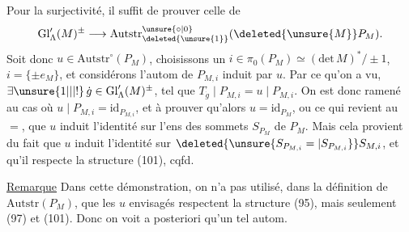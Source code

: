 Pour la surjectivité, il suffit de prouver celle de
\[
\mathrm{Gl}'_\Lambda(M)^\pm\longrightarrow\mathrm{Autstr}_{\deleted{\unsure{1}}}^{\unsure{\circ|0}}(\deleted{\unsure{M}}P_M).
\]
Soit donc $u\in\mathrm{Autstr}^{\circ}(P_M)$, choisissons un  $i\in\pi_0(P_M)\simeq(\mathrm{det}\,M)^*/\pm1$, $i=\{\pm e_M\}$, et considérons l'autom de $P_{M,i}$ induit par $u$. Par ce qu'on a vu, $\exists\unsure{1|\vert|!}\,\dot g\in\mathrm{Gl}'_\Lambda(M)^\pm$, tel que $T_{\dot g}\mid P_{M,i}=u\mid P_{M,i}$. On est donc ramené au cas où  $u\mid P_{M,i}=\mathrm{id}_{P_{M,i}}$, et à prouver qu'alors $u=\mathrm{id}_{P_M}$, ou ce qui revient au $=$, que $u$ induit l'identité sur  l'ens des sommets $S_{P_M}$ de $P_M$. Mais cela provient du fait que $u$ induit l'identité sur $\deleted{\unsure{S_{P_{M,i}}=|S_{P_{M,i}}}}S_{M,i}$, et qu'il respecte la  structure (101), cqfd.

\uline{Remarque} Dans cette démonstration, on n'a pas utilisé, dans la définition de $\mathrm{Autstr}(P_M)$, que les $u$ envisagés respectent la structure (95), mais seulement (97) et (101). 
Donc on voit a posteriori qu'un tel autom.
